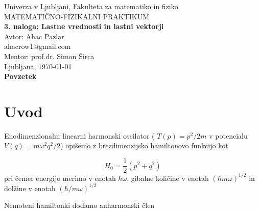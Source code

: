 \documentclass[11pt]{article}
\begin{document}
\begin{titlepage}

\begin{center}


{\large Univerza v Ljubljani, Fakulteta za matematiko in fiziko}\\[1em]

{\large MATEMATIČNO-FIZIKALNI PRAKTIKUM} \\[2em]

{\huge \bf 3. naloga: Lastne vrednosti in lastni vektorji} \\[2em]

{\large Avtor: Ahac Pazlar}\\[0.5em]

{\large ahacrow1@gmail.com}\\[1em]

{\large Mentor: prof.dr. Simon Širca }\\[1.5em]

{\large Ljubljana, \mydate\today }\\[10em]

{\bf Povzetek}\\[1em]

\begin{minipage}{\linewidth}

\end{minipage}

\tableofcontents

\end{center}
\end{titlepage}


\section{Uvod}

Enodimenzionalni linearni harmonski oscilator ( $T(p) = p^2/2m$ v potencialu $V(q)=m\omega^2 q^2/2$) opišemo z brezdimenzijsko hamiltonovo funkcijo kot

\begin{equation}
H_0 = \frac{1}{2} (p^2 + q^2)
\end{equation}
pri čemer energijo merimo v enotah $\hbar\omega$, gibalne količine v enotah $ (\hbar m\omega)^{1/2}$  in dolžine v enotah $ (\hbar/m\omega)^{1/2}$ 


Nemoteni hamiltonki dodamo anharmonski člen 
\end{document}
